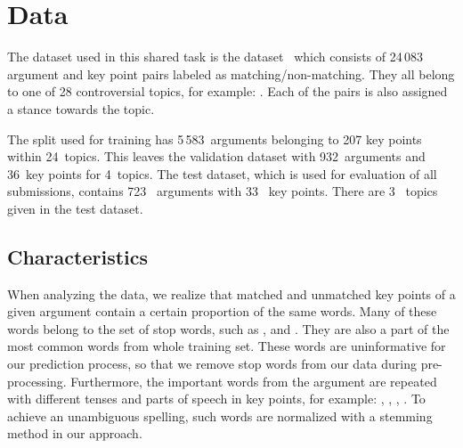 \section{Data}\label{data}

The dataset used in this shared task is the \ArgKP dataset~\cite{Bar-HaimEFKLS2020} which consists of 24\,083 argument and key point pairs labeled as matching/non-matching. They all belong to one of 28 controversial topics, for example: . Each of the pairs is also assigned a stance towards the topic. 

The split used for training has 5\,583~arguments belonging to 207 key points within 24~topics. This leaves the 
validation dataset with 932~arguments and 36~key points for 4~topics. The test dataset, which is used for evaluation of all submissions, contains 723~ arguments with 33~ key points. There are 3~ topics given in the test dataset.

\subsection{Characteristics}


When analyzing the data, we realize that matched and unmatched key points of a given argument contain a certain proportion of the same words. 
Many of these words belong to the set of stop words, such as ,  and .
They are also a part of the most common words from whole training set.
These words are uninformative for our prediction process, so that we remove stop words from our data during pre-processing. 
Furthermore, the important words from the argument are repeated with different tenses and parts of speech in key points, for example: , , , . 
To achieve an unambiguous spelling, such words are normalized with a stemming method in our approach. 

